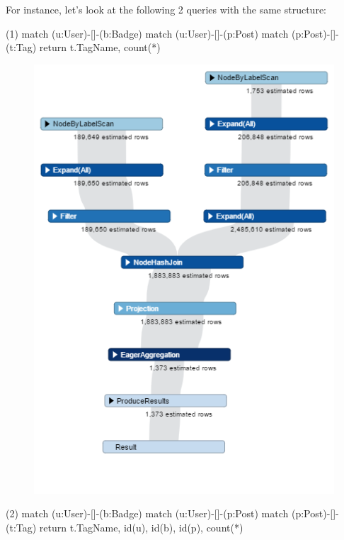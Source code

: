 \begin{itemize}
\begin{itemize}
For instance, let’s look at the following 2 queries with the same structure:

(1) match (u:User)-[]-(b:Badge)  match (u:User)-[]-(p:Post)  match (p:Post)-[]-(t:Tag)  return  t.TagName, count(*)

\begin {figure}[H]
\centering
\includegraphics[scale=0.6]{pic/61.png}
\end{figure}

(2) match (u:User)-[]-(b:Badge)  match (u:User)-[]-(p:Post)  match (p:Post)-[]-(t:Tag)  return  t.TagName, id(u), id(b), id(p), count(*)


\end{itemize}
\end{itemize}
